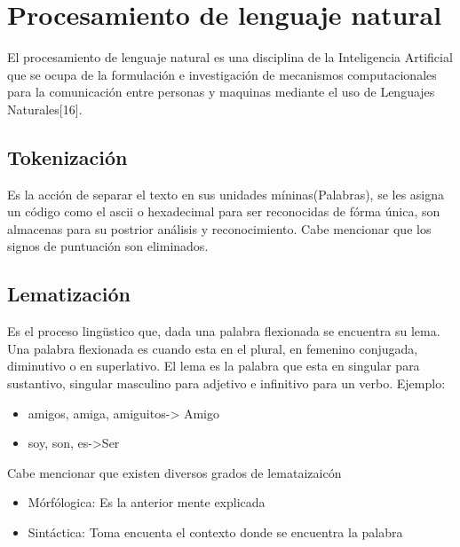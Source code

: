 \section{Procesamiento de lenguaje natural}
El procesamiento de lenguaje natural es una disciplina de la Inteligencia Artificial que se ocupa de la formulación e 
investigación de mecanismos computacionales para la comunicación entre personas y maquinas mediante el uso de Lenguajes 
Naturales[16].



\subsection{Tokenización}
Es la acción de separar el texto en sus unidades míninas(Palabras), se les
asigna un código como el ascii o hexadecimal para ser reconocidas de fórma
única, son almacenas para su postrior análisis y reconocimiento. Cabe mencionar que los
signos de puntuación son eliminados.

\subsection{Lematización}
Es el proceso lingüstico que, dada una palabra flexionada se encuentra su
lema. Una palabra flexionada es cuando esta en el plural, en femenino conjugada,
diminutivo o en superlativo. El lema es la palabra que esta en singular para
sustantivo, singular masculino para adjetivo e infinitivo para un verbo. Ejemplo:

	\begin{itemize}
		\item amigos, amiga, amiguitos-> Amigo
		\item soy, son, es->Ser
	\end{itemize}

Cabe mencionar que existen diversos grados de lemataizaicón

	\begin{itemize}
		\item Mórfólogica: Es la anterior mente explicada
		\item Sintáctica: Toma encuenta el contexto donde se encuentra la palabra

	\end{itemize}


